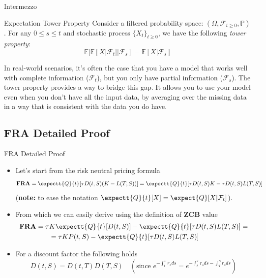 \documentclass{beamer}
\begin{document}
\begin{frame}{Intermezzo}
\begin{block}{Expectation Tower Property}
Consider a filtered probability space: $(\Omega, \mathcal{F}_{t\geq 0}, \mathbb{P})$.
For any $0\leq s \leq t$ and stochastic process $\{X_t\}_{t\geq 0}$, we have the following \emph{tower property}:
\begin{equation}	
\mathbb{E}[\mathbb{E}[X|\mathcal{F}_t]|\mathcal{F}_s]=\mathbb{E}[X|\mathcal{F}_s]
\end{equation}
\end{block}


In real-world scenarios, it's often the case that you have a model that works well with complete information ($\mathcal{F}_t$), but you only have partial information ($\mathcal{F}_s$). The tower property provides a way to bridge this gap. It allows you to use your model even when you don't have all the input data, by averaging over the missing data in a way that is consistent with the data you do have.
\end{frame}

\subsection{FRA Detailed Proof}
\begin{frame}{FRA Detailed Proof}
\begin{itemize}
	\item<1-> Let's start from the risk neutral pricing formula
	\begin{equation} \textbf{FRA} = 
\expectt{Q}{t}[\tau D(t,S)(K - L(T,S))] = 	\expectt{Q}{t}[\tau D(t,S)K - \tau D(t,S)L(T,S)]
	\label{eq:fra_as_expectation}
	\end{equation}
	(\textbf{note:} to ease the notation $\expectt{Q}{t}[X] = \expect{Q}[X|\mathcal{F}_t]$).
	\item<2-> From which we can easily derive using the definition of \textbf{ZCB} value
	\begin{equation*}
		\begin{aligned}
		\textbf{FRA} = \tau &K\expectt{Q}{t}[D(t,S)] - \expectt{Q}{t}[\tau D(t,S)L(T,S)] = \\
		&=\tau KP(t,S) - \expectt{Q}{t}[\tau D(t,S)L(T,S)]
		\end{aligned}
	\end{equation*}
	\item<3-> For a discount factor the following holds
	\begin{equation*}
		D(t,S) = D(t,T)D(T,S)\quad(\text{since }e^{-\int_t^S r_s ds} = e^{-\int_t^T r_s ds - \int_T^S r_s ds}) 
	\end{equation*}
\end{itemize}
\end{frame}
\end{document}
